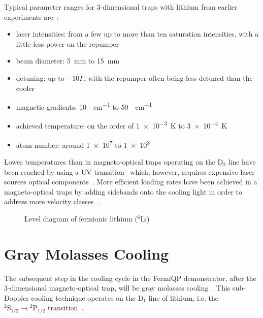 Typical parameter ranges for 3-dimensional traps with lithium from earlier experiments are~\cite{
    tiecke_high-flux_2009,
    kawanaka_decay_1993,
    schunemann_magneto-optic_1998,
    mewes_simultaneous_1999,
    hilker_laser_2012,
    kerkmann_novel_2019,
    ladouceur_compact_2009,
    chen_lithium-cesium_2021,    
    burchianti_efficient_2014,
    li_enhanced_2015,
}:
\begin{itemize}
    \item laser intensities: from a few up to more than ten saturation intensities, with a little less power on the repumper
    \item beam diameter: \SI{5}{\milli\meter} to \SI{15}{\milli\meter}
    \item detuning: up to $-10 \Gamma$, with the repumper often being less detuned than the cooler
    \item magnetic gradients: \SI{10}{\gauss\per\centi\meter} to \SI{50}{\gauss\per\centi\meter}
    \item achieved temperature: on the order of \SI{1e-3}{\kelvin} to \SI{3e-4}{\kelvin}
    \item atom number: around \SI{1e7}{} to \SI{1e8}{}
\end{itemize}

Lower temperatures than in magneto-optical traps operating on the D$_2$ line have been reached by using a UV transition~\cite{duarte_all-optical_2011,omran_microscopic_2015} which, however, requires expensive laser sources optical components~\cite{burchianti_efficient_2014}. More efficient loading rates have been achieved in a magneto-optical traps by adding sidebands onto the cooling light in order to address more velocity classes~\cite{li_enhanced_2015}.


\begin{figure}
    \caption{Level diagram of fermionic lithium ($^6$Li)}\label{fig:lithium_level_diagram}
\end{figure}

\section{Gray Molasses Cooling}
The subsequent step in the cooling cycle in the FermiQP demonstrator, after the 3-dimensional magneto-optical trap, will be gray molasses cooling~\cite{grynberg_proposal_1994,weidemuller_novel_1994}. This sub-Doppler cooling technique operates on the D$_1$ line of lithium, i.e. the $^2\text{S}_{1/2} \rightarrow {^2\text{P}_{1/2}}$ transition~\cite{burchianti_efficient_2014}.


